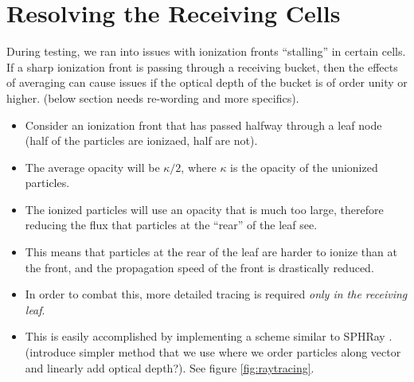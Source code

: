 \section{Resolving the Receiving Cells}
\label{sec:resolvingleaves}

During testing, we ran into issues with ionization fronts ``stalling'' in certain cells. If a sharp ionization front is passing through a receiving bucket, then the effects of averaging can cause issues if the optical depth of the bucket is of order unity or higher. (below section needs re-wording and more specifics).

\begin{itemize}
\item Consider an ionization front that has passed halfway through a leaf node (half of the particles are ionizaed, half are not).
\item The average opacity will be $\kappa/2$, where $\kappa$ is the opacity of the unionized particles.
\item The ionized particles will use an opacity that is much too large, therefore reducing the flux that particles at the ``rear'' of the leaf see.
\item This means that particles at the rear of the leaf are harder to ionize than at the front, and the propagation speed of the front is drastically reduced.
\item In order to combat this, more detailed tracing is required \emph{only in the receiving leaf}.
\item This is easily accomplished by implementing a scheme similar to SPHRay \citep{altayCroftPelupessi08}. (introduce simpler method that we use where we order particles along vector and linearly add optical depth?). See figure \ref{fig:raytracing}.
\end{itemize}


